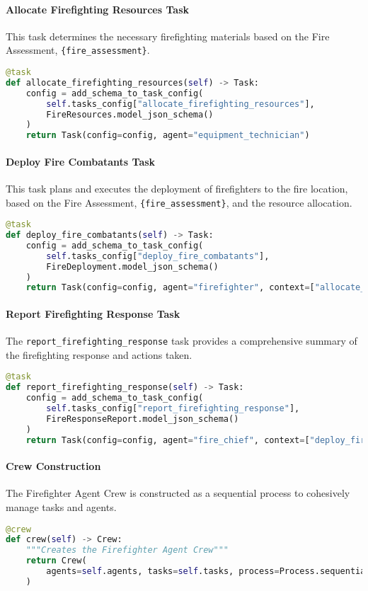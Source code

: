 \paragraph{Allocate Firefighting Resources Task}
This task determines the necessary firefighting materials based on the Fire Assessment, \texttt{\{fire\_assessment\}}.

\begin{lstlisting}[language=Python]
@task
def allocate_firefighting_resources(self) -> Task:
    config = add_schema_to_task_config(
        self.tasks_config["allocate_firefighting_resources"],
        FireResources.model_json_schema()
    )
    return Task(config=config, agent="equipment_technician")
\end{lstlisting}

\paragraph{Deploy Fire Combatants Task}
This task plans and executes the deployment of firefighters to the fire location, based on the Fire Assessment, \texttt{\{fire\_assessment\}}, and the resource allocation.

\begin{lstlisting}[language=Python]
@task
def deploy_fire_combatants(self) -> Task:
    config = add_schema_to_task_config(
        self.tasks_config["deploy_fire_combatants"],
        FireDeployment.model_json_schema()
    )
    return Task(config=config, agent="firefighter", context=["allocate_firefighting_resources"])
\end{lstlisting}

\paragraph{Report Firefighting Response Task}
The \texttt{report\_firefighting\_response} task provides a comprehensive summary of the firefighting response and actions taken.

\begin{lstlisting}[language=Python]
@task
def report_firefighting_response(self) -> Task:
    config = add_schema_to_task_config(
        self.tasks_config["report_firefighting_response"],
        FireResponseReport.model_json_schema()
    )
    return Task(config=config, agent="fire_chief", context=["deploy_fire_combatants"])
\end{lstlisting}

\paragraph{Crew Construction}
The Firefighter Agent Crew is constructed as a sequential process to cohesively manage tasks and agents.

\begin{lstlisting}[language=Python]
@crew
def crew(self) -> Crew:
    """Creates the Firefighter Agent Crew"""
    return Crew(
        agents=self.agents, tasks=self.tasks, process=Process.sequential, verbose=True
    )
\end{lstlisting}
